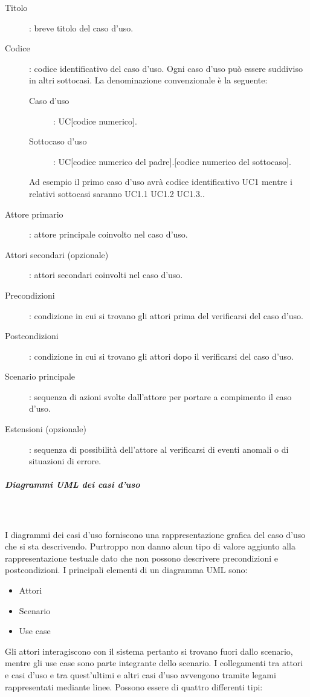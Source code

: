 \documentclass[../norme-di-progetto.tex]{subfiles}
\begin{document}
\begin{description}
\item [Titolo]: breve titolo del caso d'uso.
\item [Codice]: codice identificativo del caso d'uso. Ogni caso d'uso può essere suddiviso in altri sottocasi. La denominazione convenzionale è la seguente:
\begin{description}
	\item [Caso d'uso]: UC[codice numerico].
    \item [Sottocaso d'uso]: UC[codice numerico del padre].[codice numerico del sottocaso].
\end{description}
Ad esempio il primo caso d'uso avrà codice identificativo UC1 mentre i relativi sottocasi saranno UC1.1 UC1.2 UC1.3..
\item [Attore primario]: attore principale coinvolto nel caso d'uso.
\item [Attori secondari (opzionale)]: attori secondari coinvolti nel caso d'uso.
\item [Precondizioni]: condizione in cui si trovano gli attori prima del verificarsi del caso d'uso.
\item [Postcondizioni]: condizione in cui si trovano gli attori dopo il verificarsi del caso d'uso.
\item [Scenario principale]: sequenza di azioni svolte dall'attore per portare a compimento il caso d'uso.
\item [Estensioni (opzionale)]: sequenza di possibilità dell'attore al verificarsi di eventi anomali o di situazioni di errore.
\end{description}
\subparagraph{Diagrammi UML dei casi d'uso}\mbox{}\\
\label{subp:diagrammi UML dei casi d'uso}
\\I diagrammi dei casi d'uso forniscono una rappresentazione grafica del caso d'uso che si sta descrivendo. Purtroppo non danno alcun tipo di valore aggiunto alla rappresentazione testuale dato che non possono descrivere precondizioni e postcondizioni. I principali elementi di un diagramma UML sono:
\begin{itemize}
	\item Attori
	\item Scenario
	\item Use case
\end{itemize}
Gli attori interagiscono con il sistema pertanto si trovano fuori dallo scenario, mentre gli use case sono parte integrante dello scenario. I collegamenti tra attori e casi d'uso e tra quest'ultimi e altri casi d'uso avvengono tramite legami rappresentati mediante linee. Possono essere di quattro differenti tipi:
\end{document}
